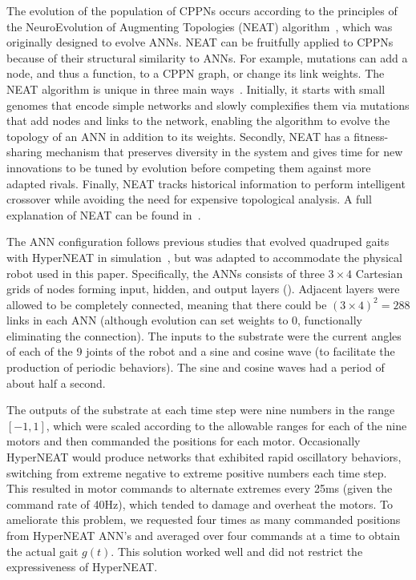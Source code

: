The evolution of the population of CPPNs occurs according to the
principles of the NeuroEvolution of Augmenting Topologies (NEAT)
algorithm~\cite{stanley2002evolving}, which was originally designed to
evolve ANNs. NEAT can be fruitfully applied to CPPNs because of their
structural similarity to ANNs. For example, mutations can add a node,
and thus a function, to a CPPN graph, or change its link weights. The
NEAT algorithm is unique in three main
ways~\cite{stanley2002evolving}. Initially, it starts with small
genomes that encode simple networks and slowly complexifies them via
mutations that add nodes and links to the network, enabling the
algorithm to evolve the topology of an ANN in addition to its
weights. Secondly, NEAT has a fitness-sharing mechanism that preserves
diversity in the system and gives time for new innovations to be tuned
by evolution before competing them against more adapted
rivals. Finally, NEAT tracks historical information to perform
intelligent crossover while avoiding the need for expensive
topological analysis. A full explanation of NEAT can be found
in~\cite{stanley2002evolving}.
  
The ANN configuration follows previous studies that evolved quadruped
gaits with HyperNEAT in simulation~\cite{clune2011performance,
  clune2009evolving}, but was adapted to accommodate the physical robot used in this paper. Specifically, the ANNs consists of three $3 \times 4$
Cartesian grids of nodes forming input, hidden, and output
layers (). Adjacent layers were allowed to be completely connected, meaning that there
could be $(3 \times 4)^2= 288$ links in each ANN (although evolution can set weights to 0, functionally eliminating the connection). The inputs to the
substrate were the current angles of each of the 9 joints of the robot and a sine and cosine wave (to facilitate the
production of periodic behaviors). The sine and cosine waves had a period of about half a second.

The outputs of the substrate at each time step were nine numbers in
the range $[-1,1]$, which were scaled according to the allowable
ranges for each of the nine motors and then commanded
the positions for each motor.  Occasionally HyperNEAT would produce networks that
exhibited rapid oscillatory behaviors, switching from extreme negative to extreme positive numbers each time step.  This resulted in motor
commands to alternate extremes every 25ms (given the command rate of
40Hz), which tended to damage and overheat the motors.  To ameliorate
this problem, we requested four times as many commanded
positions from HyperNEAT ANN's and averaged over four commands at a time to
obtain the actual gait $g(t)$.  This solution worked well and did not restrict the expressiveness of HyperNEAT.

